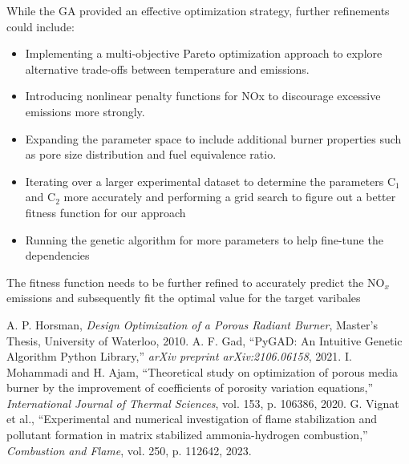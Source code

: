 \documentclass[12pt]{report}
\begin{document}
While the GA provided an effective optimization strategy, further refinements could include:
\begin{itemize}
    \item Implementing a multi-objective Pareto optimization approach to explore alternative trade-offs between temperature and emissions.
    \item Introducing nonlinear penalty functions for NOx to discourage excessive emissions more strongly.
    \item Expanding the parameter space to include additional burner properties such as pore size distribution and fuel equivalence ratio.
    \item Iterating over a larger experimental dataset to determine the parameters C$_{1}$ and C$_{2}$ more accurately and performing a grid search to figure out a better fitness function for our approach
    \item Running the genetic algorithm for more parameters to help fine-tune the dependencies
\end{itemize}


The fitness function needs to be further refined to accurately predict the NO$_{x}$ emissions and subsequently fit the optimal value for the target varibales




\newpage

\begin{thebibliography}{9}

A. P. Horsman, \textit{Design Optimization of a Porous Radiant Burner}, Master’s Thesis, University of Waterloo, 2010.
A. F. Gad, ``PyGAD: An Intuitive Genetic Algorithm Python Library,'' \textit{arXiv preprint arXiv:2106.06158}, 2021.
I. Mohammadi and H. Ajam, ``Theoretical study on optimization of porous media burner by the improvement of coefficients of porosity variation equations,'' \textit{International Journal of Thermal Sciences}, vol. 153, p. 106386, 2020.
G. Vignat et al., ``Experimental and numerical investigation of flame stabilization and pollutant formation in matrix stabilized ammonia-hydrogen combustion,'' \textit{Combustion and Flame}, vol. 250, p. 112642, 2023.

 

\end{thebibliography}
\end{document}
